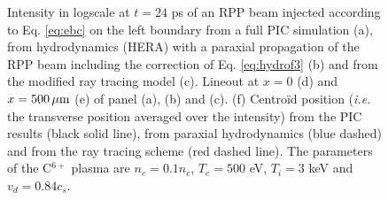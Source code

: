 \documentclass[%
 reprint,
 amsmath,amssymb,
 aps,
]{revtex4-1}
\begin{document}
\begin{figure}
\begin{tabular}{ccc}
\end{tabular}
\caption{ \label{fig:comthpicrpp} 
 Intensity in logscale at $t = 24$ ps of an RPP beam injected according to Eq. \eqref{eq:ebc} on the left boundary from a full PIC simulation (a), from hydrodynamics (HERA) with a paraxial propagation of the RPP beam including the correction of Eq. \eqref{eq:hydrof3} (b) and from the modified ray tracing model (c).  Lineout at $x=0$ (d) and $x=500 \, \rm \mu m$ (e) of   panel (a), (b) and (c). 
 (f) Centro\"id position (\emph{i.e.} the transverse position averaged over the intensity) from the PIC results (black solid line), from paraxial hydrodynamics (blue dashed) and  from the ray tracing scheme (red dashed line). The parameters of the C$^{6+}$ plasma are $n_e=0.1n_c$, $T_e=500$ eV, $T_i=3$ keV and $v_d=0.84 c_s$. }
\end{figure}
\end{document}
